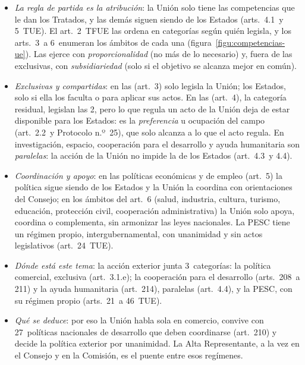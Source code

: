 \documentclass[11pt]{article}
\begin{document}
\begin{itemize}
\item \emph{La regla de partida es la atribución}: la Unión solo tiene las competencias que le dan los Tratados, y las demás siguen siendo de los Estados (arts.~4.1~y 5~TUE). El art.~2~TFUE las ordena en categorías según quién legisla, y los arts.~3~a 6~enumeran los ámbitos de cada una (figura~\ref{figu:competencias-ue}). Las ejerce con \emph{proporcionalidad} (no más de lo necesario) y, fuera de las exclusivas, con \emph{subsidiariedad} (solo si el objetivo se alcanza mejor en común).
\item \emph{Exclusivas y compartidas}: en las  (art.~3) solo legisla la Unión; los Estados, solo si ella los faculta o para aplicar sus actos. En las  (art.~4), la categoría residual, legislan las 2, pero lo que regula un acto de la Unión deja de estar disponible para los Estados: es la \emph{preferencia} u ocupación del campo (art.~2.2~y Protocolo n.º~25), que solo alcanza a lo que el acto regula. En investigación, espacio, cooperación para el desarrollo y ayuda humanitaria son \emph{paralelas}: la acción de la Unión no impide la de los Estados (art.~4.3~y 4.4).
\item \emph{Coordinación y apoyo}: en las políticas económicas y de empleo (art.~5) la política sigue siendo de los Estados y la Unión la coordina con orientaciones del Consejo; en los ámbitos del art.~6 (salud, industria, cultura, turismo, educación, protección civil, cooperación administrativa) la Unión solo apoya, coordina o complementa, sin armonizar las leyes nacionales. La PESC tiene un régimen propio, intergubernamental, con unanimidad y sin actos legislativos (art.~24~TUE).
\item \emph{Dónde está este tema}: la acción exterior junta 3~categorías: la política comercial, exclusiva (art.~3.1.e); la cooperación para el desarrollo (arts.~208~a 211) y la ayuda humanitaria (art.~214), paralelas (art.~4.4), y la PESC, con su régimen propio (arts.~21~a 46~TUE).
\item \emph{Qué se deduce}: por eso la Unión habla sola en comercio, convive con 27~políticas nacionales de desarrollo que deben coordinarse (art.~210) y decide la política exterior por unanimidad. La Alta Representante, a la vez en el Consejo y en la Comisión, es el puente entre esos regímenes.
\end{itemize}

\begin{infografia}[H]
\centering
\caption{El reparto de competencias de la Unión (arts.~2~a 6~TFUE): la acción exterior}\label{figu:competencias-ue}
\end{infografia}
\end{document}
